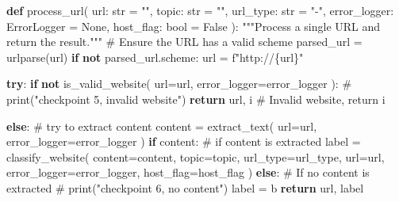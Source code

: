 \documentclass[
  titlepage]{article}
\newenvironment{Shaded}{\begin{snugshade}}{\end{snugshade}}
\newcommand{\BuiltInTok}[1]{\textcolor[rgb]{0.00,0.23,0.31}{#1}}
\newcommand{\CommentTok}[1]{\textcolor[rgb]{0.37,0.37,0.37}{#1}}
\newcommand{\ControlFlowTok}[1]{\textcolor[rgb]{0.00,0.23,0.31}{\textbf{#1}}}
\newcommand{\KeywordTok}[1]{\textcolor[rgb]{0.00,0.23,0.31}{\textbf{#1}}}
\newcommand{\NormalTok}[1]{\textcolor[rgb]{0.00,0.23,0.31}{#1}}
\newcommand{\OperatorTok}[1]{\textcolor[rgb]{0.37,0.37,0.37}{#1}}
\newcommand{\SpecialCharTok}[1]{\textcolor[rgb]{0.37,0.37,0.37}{#1}}
\newcommand{\SpecialStringTok}[1]{\textcolor[rgb]{0.13,0.47,0.30}{#1}}
\newcommand{\StringTok}[1]{\textcolor[rgb]{0.13,0.47,0.30}{#1}}
\newcommand{\VariableTok}[1]{\textcolor[rgb]{0.07,0.07,0.07}{#1}}
\begin{document}
\begin{Shaded}
\begin{Highlighting}[]
\KeywordTok{def}\NormalTok{ process\_url(}
\NormalTok{    url: }\BuiltInTok{str} \OperatorTok{=} \StringTok{""}\NormalTok{, }
\NormalTok{    topic: }\BuiltInTok{str} \OperatorTok{=} \StringTok{""}\NormalTok{, }
\NormalTok{    url\_type: }\BuiltInTok{str} \OperatorTok{=} \StringTok{"{-}"}\NormalTok{, }
\NormalTok{    error\_logger: ErrorLogger }\OperatorTok{=} \VariableTok{None}\NormalTok{,}
\NormalTok{    host\_flag: }\BuiltInTok{bool} \OperatorTok{=} \VariableTok{False}
\NormalTok{        ):}
    \CommentTok{"""Process a single URL and return the result."""}
    \CommentTok{\# Ensure the URL has a valid scheme}
\NormalTok{    parsed\_url }\OperatorTok{=}\NormalTok{ urlparse(url)}
    \ControlFlowTok{if} \KeywordTok{not}\NormalTok{ parsed\_url.scheme:}
\NormalTok{        url }\OperatorTok{=} \SpecialStringTok{f"http://}\SpecialCharTok{\{}\NormalTok{url}\SpecialCharTok{\}}\SpecialStringTok{"}
    
    \ControlFlowTok{try}\NormalTok{:}
        \ControlFlowTok{if} \KeywordTok{not}\NormalTok{ is\_valid\_website(}
\NormalTok{            url}\OperatorTok{=}\NormalTok{url, }
\NormalTok{            error\_logger}\OperatorTok{=}\NormalTok{error\_logger}
\NormalTok{            ):}
            \CommentTok{\# print("checkpoint 5, invalid website")}
            \ControlFlowTok{return}\NormalTok{ url, }\StringTok{\textquotesingle{}i\textquotesingle{}} \CommentTok{\# Invalid website, return \textquotesingle{}i\textquotesingle{}}

        \ControlFlowTok{else}\NormalTok{: }\CommentTok{\# try to extract content}
\NormalTok{            content }\OperatorTok{=}\NormalTok{ extract\_text(}
\NormalTok{                url}\OperatorTok{=}\NormalTok{url,}
\NormalTok{                error\_logger}\OperatorTok{=}\NormalTok{error\_logger}
\NormalTok{            )}
            \ControlFlowTok{if}\NormalTok{ content: }\CommentTok{\# if content is extracted}
\NormalTok{                label }\OperatorTok{=}\NormalTok{ classify\_website(}
\NormalTok{                    content}\OperatorTok{=}\NormalTok{content,}
\NormalTok{                    topic}\OperatorTok{=}\NormalTok{topic,}
\NormalTok{                    url\_type}\OperatorTok{=}\NormalTok{url\_type,}
\NormalTok{                    url}\OperatorTok{=}\NormalTok{url,}
\NormalTok{                    error\_logger}\OperatorTok{=}\NormalTok{error\_logger,}
\NormalTok{                    host\_flag}\OperatorTok{=}\NormalTok{host\_flag}
\NormalTok{                )}
            \ControlFlowTok{else}\NormalTok{: }\CommentTok{\# If no content is extracted}
                \CommentTok{\# print("checkpoint 6, no content")}
\NormalTok{                label }\OperatorTok{=} \StringTok{\textquotesingle{}b\textquotesingle{}}
        \ControlFlowTok{return}\NormalTok{ url, label}


\end{Highlighting}
\end{Shaded}
\end{document}
